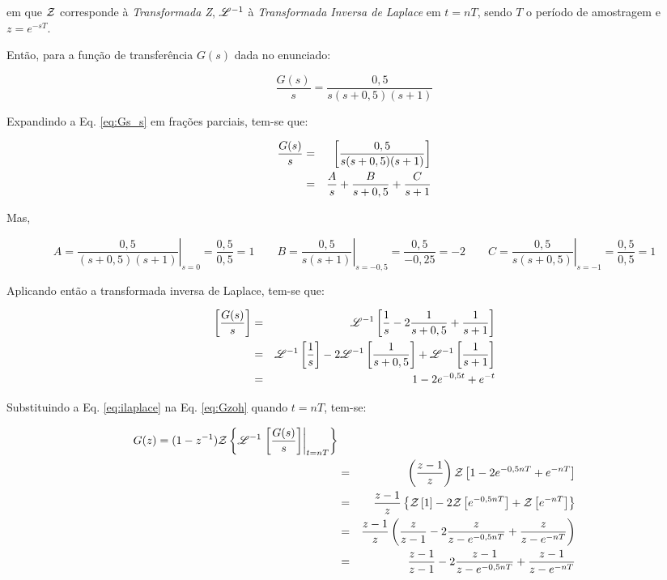 \noindent em que $\mathcal{Z}$ corresponde à {\it Transformada Z}, $\mathscr{L}^{-1}$ à {\it
Transformada Inversa de Laplace} em $t = nT$, sendo $T$ o período de amostragem
e $z = e^{-sT}$.

Então, para a função de transferência $G(s)$ dada no enunciado:

\begin{equation}\label{eq:Gs_s}
\frac{G(s)}{s} = \frac{0,5}{s(s+0,5)(s+1)}
\end{equation}

Expandindo a Eq. \ref{eq:Gs_s} em frações parciais, tem-se que:

\begin{eqnarray}\label{eq:frac_parc}
\frac{G(s)}{s} & = & \left[\frac{0,5}{s(s+0,5)(s+1)}\right]\nonumber\\
& = & \frac{A}{s} + \frac{B}{s+0,5} + \frac{C}{s+1}\nonumber\\
\end{eqnarray}

Mas,

\begin{equation*}
A = \left.\frac{0,5}{(s+0,5)(s+1)}\right|_{s = 0} = \frac{0,5}{0,5} = 1
\qquad
B = \left.\frac{0,5}{s(s+1)}\right|_{s = -0,5} = \frac{0,5}{-0,25} = -2
\qquad
C = \left.\frac{0,5}{s(s+0,5)}\right|_{s = -1} = \frac{0,5}{0,5} = 1
\end{equation*}

Aplicando então a transformada inversa de Laplace, tem-se que:

\begin{eqnarray}\label
\ilaplace\colchete{\frac{G(s)}{s}}
& = & \ilaplace\colchete{\frac{1}{s} - 
                         2\frac{1}{s+0,5} + 
                         \frac{1}{s+1}}\nonumber\\
& = & \ilaplace\colchete{\frac{1}{s}} - 
      2\ilaplace\colchete{\frac{1}{s+0,5}} + 
      \ilaplace\colchete{\frac{1}{s+1}}\nonumber\\
& = & 1 - 2e^{-0,5t} + e^{-t}\label{eq:ilaplace}
\end{eqnarray}

Substituindo a Eq. \ref{eq:ilaplace} na Eq. \ref{eq:Gzoh} quando $t = nT$,
tem-se:

\begin{eqnarray}
G(z) = (1 - z^{-1})
       \mathcal{Z}\left\{\mathscr{L}^{-1}\left.\left[\frac{G(s)}{s}\right]
                             \right|_{t = nT}\right\}\nonumber\\
& = & \left(\frac{z-1}{z}\right)
      \mathcal{Z}\left[1 - 2e^{-0,5nT} + e^{-nT}\right]\nonumber\\
& = & \frac{z-1}{z}\left\{\mathcal{Z}\left[1\right] - 
                          2\mathcal{Z}\left[e^{-0,5nT}\right] + 
                          \mathcal{Z}\left[e^{-nT}\right]\right\}\nonumber\\
& = & \frac{z-1}{z}\left(\frac{z}{z-1} - 
                           2\frac{z}{z-e^{-0,5nT}} + 
                           \frac{z}{z - e^{-nT}} \right)\nonumber\\
& = & \frac{z-1}{z-1} - 
      2\frac{z-1}{z-e^{-0,5nT}} + 
      \frac{z-1}{z - e^{-nT}}\nonumber\\
\end{eqnarray}

